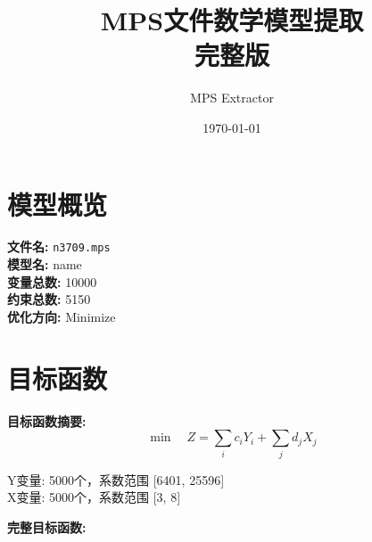 \documentclass[a4paper,10pt]{article}
\title{MPS文件数学模型提取\\{\large 完整版}}
\author{MPS Extractor}
\date{\today}
\begin{document}
\maketitle
\tableofcontents
\newpage

\section{模型概览}

\textbf{文件名:} \texttt{n3709.mps} \\
\textbf{模型名:} name \\
\textbf{变量总数:} 10000 \\
\textbf{约束总数:} 5150 \\
\textbf{优化方向:} Minimize \\

\section{目标函数}

\textbf{目标函数摘要:}
\begin{equation}
\min \quad Z = \sum_{i} c_i Y_i + \sum_{j} d_j X_j
\end{equation}

Y变量: 5000个，系数范围 [6401, 25596] \\
X变量: 5000个，系数范围 [3, 8]

\textbf{完整目标函数:}
\end{document}
